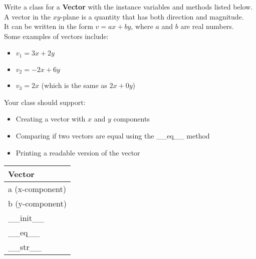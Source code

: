 


	\item
		Write a class for a \textbf{Vector} with the instance variables and methods listed below.\\
		A vector in the $xy$-plane is a quantity that has both direction and magnitude.\\ It can 
		be written in the form $v = ax + by$, where $a$ and $b$ are real numbers.\\[0.5em]
		Some examples of vectors include:
		
		\begin{minipage}[t]{0.65\textwidth}
			\begin{itemize}
				\item $v_1 = 3x + 2y$
				\item $v_2 = -2x + 6y$
				\item $v_3 = 2x$ (which is the same as $2x + 0y$)
			\end{itemize}

			Your class should support:
			\begin{itemize}
				\item Creating a vector with $x$ and $y$ components
				\item Comparing if two vectors are equal using the \_\_eq\_\_ method
				\item Printing a readable version of the vector
			\end{itemize}
		\end{minipage}
		\hfill
		\begin{minipage}[t]{0.32\textwidth}
			\vspace{-1.2em} %
			\begin{flushright}
				\begin{tabular}{|l|}
					\hline
					Vector \\ \hline
					a (x-component) \\
					b (y-component) \\ \hline
					\_\_init\_\_ \\
					\_\_eq\_\_ \\
					\_\_str\_\_ \\ \hline
				\end{tabular}
			\end{flushright}
		\end{minipage}
		
